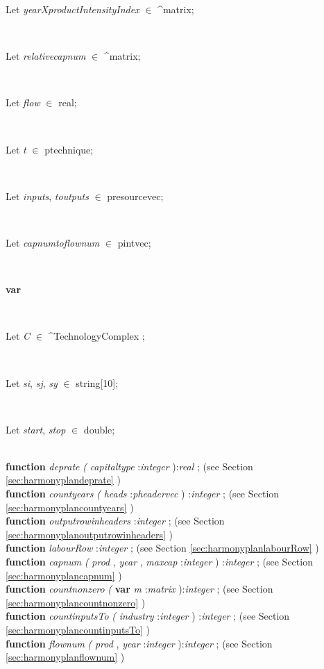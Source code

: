 \documentclass[10pt, a4paper]{article}
\begin{document}
\begin{tabbing}
\parbox{14cm}{\textsf{Let \textit{yearXproductIntensityIndex} $\in$ \^{}matrix;}}\\
\parbox{14cm}{\textsf{Let \textit{relativecapnum} $\in$ \^{}matrix;}}\\
\parbox{14cm}{\textsf{Let \textit{flow} $\in$ real;}}\\
\parbox{14cm}{\textsf{Let \textit{t} $\in$ ptechnique;}}\\
\parbox{14cm}{\textsf{Let \textit{inputs}, \textit{toutputs} $\in$ presourcevec;}}\\
\parbox{14cm}{\textsf{Let \textit{capnumtoflownum} $\in$ pintvec;}}\\
\<\parbox{14cm}{\textsf{\textbf{var} }}\\
\parbox{14cm}{\textsf{Let \textit{C} $\in$ \^{}TechnologyComplex ;}}\\
\parbox{14cm}{\textsf{Let \textit{si}, \textit{sj}, \textit{sy} $\in$ string[10];}}\\
\parbox{14cm}{\textsf{Let \textit{start}, \textit{stop} $\in$ double;}}\\
\<\textsf{\textbf{function}  \textit{deprate} \textit{(} \textit{capitaltype} :\textit{integer} ):\textit{real} ;} (see Section \ref{sec:harmonyplandeprate} )\\
\<\textsf{\textbf{function}  \textit{countyears} \textit{(} \textit{heads} :\textit{pheadervec} ) :\textit{integer} ;} (see Section \ref{sec:harmonyplancountyears} )\\
\<\textsf{\textbf{function}  \textit{outputrowinheaders} :\textit{integer} ;} (see Section \ref{sec:harmonyplanoutputrowinheaders} )\\
\<\textsf{\textbf{function}  \textit{labourRow} :\textit{integer} ;} (see Section \ref{sec:harmonyplanlabourRow} )\\
\<\textsf{\textbf{function}  \textit{capnum} \textit{(}  \textit{prod} , \textit{year} , \textit{maxcap} :\textit{integer} ) :\textit{integer} ;} (see Section \ref{sec:harmonyplancapnum} )\\
\<\textsf{\textbf{function}  \textit{countnonzero} \textit{(} \textbf{var}  \textit{m} :\textit{matrix} ):\textit{integer} ;} (see Section \ref{sec:harmonyplancountnonzero} )\\
\<\textsf{\textbf{function}  \textit{countinputsTo} \textit{(}  \textit{industry} :\textit{integer} ) :\textit{integer} ;} (see Section \ref{sec:harmonyplancountinputsTo} )\\
\<\textsf{\textbf{function}  \textit{flownum} \textit{(}  \textit{prod} ,  \textit{year} :\textit{integer} ):\textit{integer} ;} (see Section \ref{sec:harmonyplanflownum} )\\

\end{tabbing}
\end{document}
